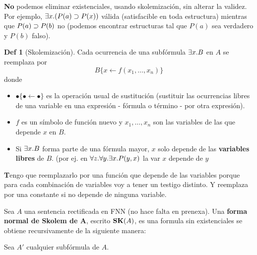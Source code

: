 \documentclass{report}
\theoremstyle{definition} %
\newtheorem*{definition*}{Def}
\newenvironment{nota}[1]
    {\begin{leftbar}\textbf{#1}}
    {\end{leftbar}}
\newcommand{\sustOne}[3]{#1 \{ #2 \leftarrow #3 \}}
\begin{document}
\textbf{No} podemos eliminar existenciales, usando skolemización, sin alterar la
validez. Por ejemplo, $\exists x . (P(a) \supset P(x))$ válida (satisfacible en
toda estructura) mientras que $P(a) \supset P(b)$ no (podemos encontrar
estructuras tal que $P(a)$ sea verdadero y $P(b)$ falso).

\begin{definition*}[Skolemización]
    Cada ocurrencia de una subfórmula $\exists x . B$ en $A$ se reemplaza por
    \[
        \sustOne{B}{x}{f(x_1,\dots,x_n)}
    \]
    donde
    \begin{itemize}
        \item $\sustOne{\bullet}{\bullet}{\bullet}$ es la operación usual de
        sustitución (sustituir las ocurrencias libres de una variable en una
        expresión - fórmula o término - por otra expresión).
        \item $f$ es un símbolo de función nuevo y $x_1, \dots, x_n$ son las
        variables de las que depende $x$ en $B$.
        \item Si $\exists x . B$ forma parte de una fórmula mayor, $x$ solo
        depende de las \textbf{variables libres} de $B$.
        (por ej. en $\forall z . \forall y . \exists x . P(y, x)$ la var $x$
        depende de $y$
    \end{itemize}
    
    \begin{nota}
        Tengo que reemplazarlo por una función que depende de las variables
        porque para cada combinación de variables voy a tener un testigo
        distinto. Y reemplaza por una constante si no depende de ninguna
        variable.
    \end{nota}

    Sea $A$ una sentencia rectificada en FNN (no hace falta en prenexa). Una
    \textbf{forma normal de Skolem de A}, escrito $\text{\textbf{SK}}(A)$, es una formula sin
    existenciales se obtiene recursivamente de la siguiente manera:

    Sea $A'$ cualquier subfórmula de $A$.


\end{definition*}
\end{document}
